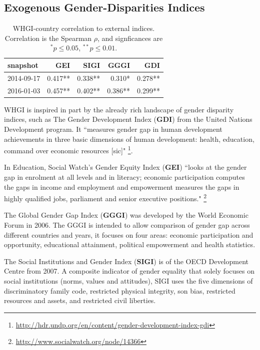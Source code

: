 \documentclass[letterpaper]{article}
\begin{document}
\subsection{Exogenous Gender-Disparities Indices}

 \begin{table}
\caption{WHGI-country correlation to external indices. Correlation is the Spearman $\rho$, and signficances are $ ^*p\leq 0.05 $, $ ^{**}p\leq 0.01$.}
\label{table:scores}
\begin{tabular}{lrrrr}
\toprule
snapshot &  GEI &  SIGI &  GGGI &  GDI  \\
\midrule
2014-09-17 &  0.417** &       0.338** &          0.310* &         0.278**  \\
2016-01-03 &  0.457** &       0.402** &          0.386** &         0.299**  \\
\bottomrule
\end{tabular}
\end{table}

WHGI is inspired in part by the already rich landscape of gender disparity indices, such as The Gender Development Index (\textbf{GDI}) from the United Nations Development program. It ``measures gender gap in human development achievements in three basic dimensions of human development: health, education, command over economic resources [sic]" \footnote{\url{http://hdr.undp.org/en/content/gender-development-index-gdi}}.

\item In Education, Social Watch's Gender Equity Index (\textbf{GEI}) ``looks at the gender gap in enrolment at all levels and in literacy; economic participation computes the gaps in income and employment and empowerment measures the gaps in highly qualified jobs, parliament and senior executive positions." \footnote{\url{http://www.socialwatch.org/node/14366}}
\item The Global Gender Gap Index (\textbf{GGGI}) was developed by the World Economic Forum in 2006. The GGGI is intended to allow comparison of gender gap across different countries and years, it focuses on four areas:  economic participation and opportunity, educational attainment, political empowerment and health statistics.
\item The Social Institutions and Gender Index (\textbf{SIGI}) is of the OECD Development Centre from 2007. A composite indicator of gender equality that solely focuses on social institutions (norms, values and attitudes), SIGI uses the five dimensions of discriminatory family code, restricted physical integrity, son bias, restricted resources and assets, and restricted civil liberties.
\end{document}
